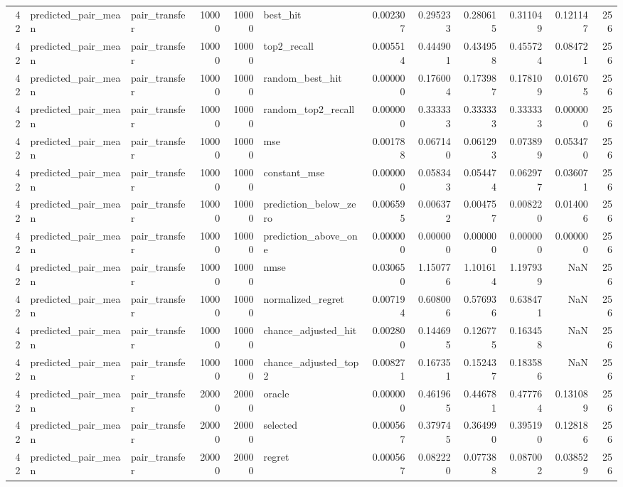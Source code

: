 \begin{tabular}{rllrrlrrrrrr}
42 & predicted_pair_mean & pair_transfer & 10000 & 10000 & best_hit & 0.002307 & 0.295233 & 0.280615 & 0.311049 & 0.121147 & 256 \\
42 & predicted_pair_mean & pair_transfer & 10000 & 10000 & top2_recall & 0.005514 & 0.444901 & 0.434958 & 0.455724 & 0.084721 & 256 \\
42 & predicted_pair_mean & pair_transfer & 10000 & 10000 & random_best_hit & 0.000000 & 0.176004 & 0.173987 & 0.178109 & 0.016705 & 256 \\
42 & predicted_pair_mean & pair_transfer & 10000 & 10000 & random_top2_recall & 0.000000 & 0.333333 & 0.333333 & 0.333333 & 0.000000 & 256 \\
42 & predicted_pair_mean & pair_transfer & 10000 & 10000 & mse & 0.001788 & 0.067140 & 0.061293 & 0.073899 & 0.053470 & 256 \\
42 & predicted_pair_mean & pair_transfer & 10000 & 10000 & constant_mse & 0.000000 & 0.058343 & 0.054474 & 0.062977 & 0.036071 & 256 \\
42 & predicted_pair_mean & pair_transfer & 10000 & 10000 & prediction_below_zero & 0.006595 & 0.006372 & 0.004757 & 0.008220 & 0.014006 & 256 \\
42 & predicted_pair_mean & pair_transfer & 10000 & 10000 & prediction_above_one & 0.000000 & 0.000000 & 0.000000 & 0.000000 & 0.000000 & 256 \\
42 & predicted_pair_mean & pair_transfer & 10000 & 10000 & nmse & 0.030650 & 1.150776 & 1.101614 & 1.197939 & NaN & 256 \\
42 & predicted_pair_mean & pair_transfer & 10000 & 10000 & normalized_regret & 0.007194 & 0.608006 & 0.576936 & 0.638471 & NaN & 256 \\
42 & predicted_pair_mean & pair_transfer & 10000 & 10000 & chance_adjusted_hit & 0.002800 & 0.144695 & 0.126775 & 0.163458 & NaN & 256 \\
42 & predicted_pair_mean & pair_transfer & 10000 & 10000 & chance_adjusted_top2 & 0.008271 & 0.167351 & 0.152437 & 0.183586 & NaN & 256 \\
42 & predicted_pair_mean & pair_transfer & 20000 & 20000 & oracle & 0.000000 & 0.461965 & 0.446781 & 0.477764 & 0.131089 & 256 \\
42 & predicted_pair_mean & pair_transfer & 20000 & 20000 & selected & 0.000567 & 0.379745 & 0.364990 & 0.395190 & 0.128186 & 256 \\
42 & predicted_pair_mean & pair_transfer & 20000 & 20000 & regret & 0.000567 & 0.082220 & 0.077388 & 0.087002 & 0.038529 & 256 \\

\end{tabular}
